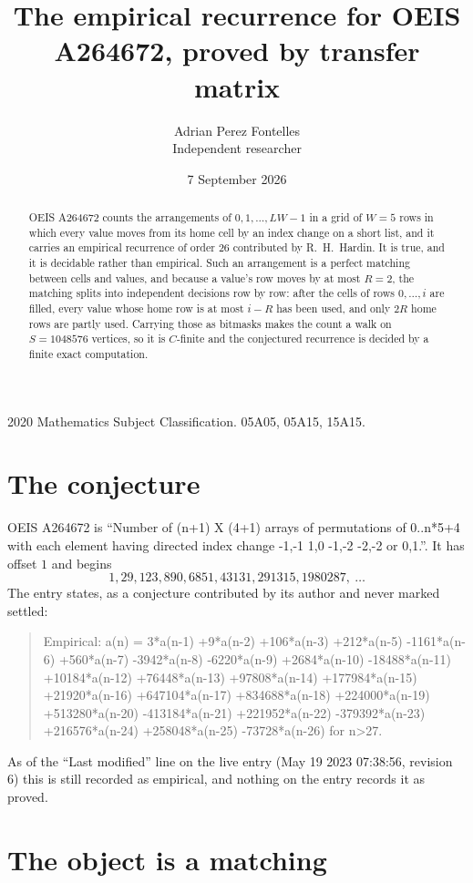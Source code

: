 \documentclass[11pt,a4paper]{article}
\title{The empirical recurrence for OEIS A264672, proved by transfer matrix}
\author{Adrian Perez Fontelles\\ \small Independent researcher}
\date{7 September 2026}
\theoremstyle{plain}
\theoremstyle{definition}
\begin{document}
\maketitle

\begin{abstract}
OEIS A264672 counts the arrangements of $0,1,\dots,LW-1$ in a grid of $W=5$ rows in which
every value moves from its home cell by an index change on a short list, and it carries an
empirical recurrence of order $26$ contributed by R.~H.~Hardin. It is true, and it is
decidable rather than empirical. Such an arrangement is a perfect matching between cells and
values, and because a value's row moves by at most $R=2$, the matching splits into
independent decisions row by row: after the cells of rows $0,\dots,i$ are filled,
every value whose home row is at most $i-R$ has been used, and only $2R$ home rows are
partly used. Carrying those as bitmasks makes the count a walk on $S=1048576$ vertices, so it is
$C$-finite and the conjectured recurrence is decided by a finite exact computation.
\end{abstract}

\noindent\small 2020 Mathematics Subject Classification. 05A05, 05A15, 15A15.\normalsize

\section{The conjecture}

OEIS A264672 is ``Number of (n+1) X (4+1) arrays of permutations of 0..n*5+4 with each element having directed index change -1,-1 1,0 -1,-2 -2,-2 or 0,1.''. It has offset $1$ and begins
\[
1, 29, 123, 890, 6851, 43131, 291315, 1980287,\ \dots
\]
The entry states, as a conjecture contributed by its author and never marked settled:
\begin{quote}
Empirical: a(n) = 3*a(n-1) +9*a(n-2) +106*a(n-3) +212*a(n-5) -1161*a(n-6) +560*a(n-7) -3942*a(n-8) -6220*a(n-9) +2684*a(n-10) -18488*a(n-11) +10184*a(n-12) +76448*a(n-13) +97808*a(n-14) +177984*a(n-15) +21920*a(n-16) +647104*a(n-17) +834688*a(n-18) +224000*a(n-19) +513280*a(n-20) -413184*a(n-21) +221952*a(n-22) -379392*a(n-23) +216576*a(n-24) +258048*a(n-25) -73728*a(n-26) for n>27.
\end{quote}
As of the ``Last modified'' line on the live entry (May 19 2023 07:38:56, revision 6) this is still
recorded as empirical, and nothing on the entry records it as proved.

\section{The object is a matching}
\end{document}
